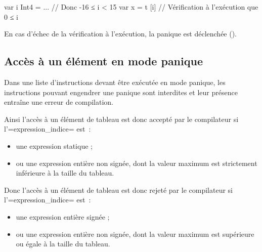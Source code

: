 \begin{PLM}
var i Int4 = ... // Donc -16 ≤ i < 15
var x = t [i] // Vérification à l'exécution que 0 ≤ i
\end{PLM}

En cas d'échec de la vérification à l'exécution, la panique est déclenchée ().

\subsection{Accès à un élément en mode panique}

Dans une liste d'instructions devant être exécutée en mode panique, les instructions pouvant engendrer une panique sont interdites et leur présence entraîne une erreur de compilation.

Ainsi l'accès à un élément de tableau est donc accepté par le compilateur si l'\plm=expression_indice= est~:
\begin{itemize}
\item une expression statique ;
\item ou une expression entière non signée, dont la valeur maximum est strictement inférieure à la taille du tableau.
\end{itemize}


Donc l'accès à un élément de tableau est donc rejeté par le compilateur si l'\plm=expression_indice= est~:
\begin{itemize}
\item une expression entière signée ;
\item ou une expression entière non signée, dont la valeur maximum est supérieure ou égale à la taille du tableau.
\end{itemize}


